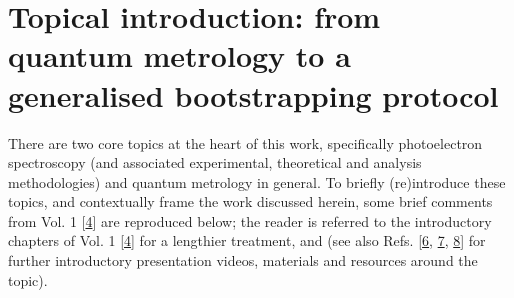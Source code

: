 \documentclass[letterpaper,table,10pt,english]{jupyterBook}
\begin{document}
\section{Topical introduction: from quantum metrology to a generalised bootstrapping protocol}
\label{\detokenize{part1/main_intro_060723:topical-introduction-from-quantum-metrology-to-a-generalised-bootstrapping-protocol}}\label{\detokenize{part1/main_intro_060723:sec-topical-intro}}
\sphinxAtStartPar
There are two core topics at the heart of this work, specifically photoelectron spectroscopy (and associated experimental, theoretical and analysis methodologies) and quantum metrology in general. To briefly (re)introduce these topics, and contextually frame the work discussed herein, some brief comments from  Vol. 1 {[}\hyperlink{cite.backmatter/bibliography:id675}{4}{]} are reproduced below; the reader is referred to the introductory chapters of  Vol. 1 {[}\hyperlink{cite.backmatter/bibliography:id675}{4}{]} for a lengthier treatment, and  (see also Refs. {[}\hyperlink{cite.backmatter/bibliography:id672}{6}, \hyperlink{cite.backmatter/bibliography:id674}{7}, \hyperlink{cite.backmatter/bibliography:id668}{8}{]} for further introductory presentation videos, materials and resources around the topic).
\end{document}
